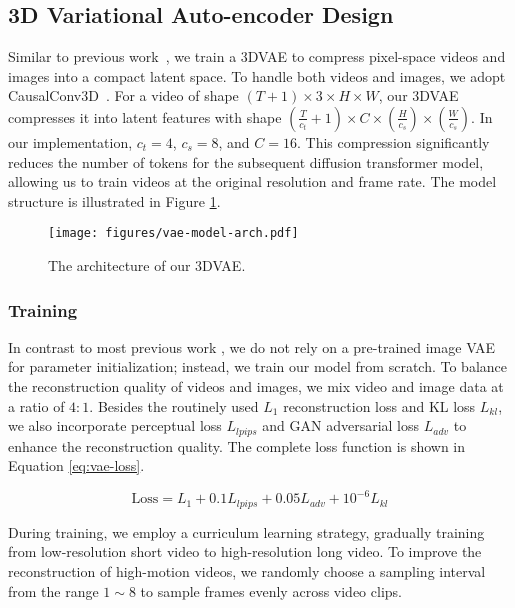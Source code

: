 \subsection{3D Variational Auto-encoder Design}\label{3dVAE}

Similar to previous work~\cite{polyak2024movie,yang2024cogvideox}, we train a 3DVAE to compress pixel-space videos and images into a compact latent space. To handle both videos and images, we adopt CausalConv3D~\cite{yu2023language}. For a video of shape $(T+1) \times 3 \times H \times W$, our 3DVAE compresses it into latent features with shape $(\frac{T}{c_t} + 1) \times C \times (\frac{H}{c_s}) \times (\frac{W}{c_s})$. In our implementation, $c_t=4$, $c_s=8$, and $C=16$. This compression significantly reduces the number of tokens for the subsequent diffusion transformer model, allowing us to train videos at the original resolution and frame rate. The model structure is illustrated in Figure \ref{fig:vae-model-arch}.

\begin{figure}[t]
    \centering
    \texttt{[image: figures/vae-model-arch.pdf]}
    \caption{ The architecture of our 3DVAE.}
    \label{fig:vae-model-arch}
\end{figure}

\subsubsection{Training}
In contrast to most previous work \cite{polyak2024movie,chen2024od,zhou2024allegro}, we do not rely on a pre-trained image VAE for parameter initialization; instead, we train our model from scratch. 
To balance the reconstruction quality of videos and images, we mix video and image data at a ratio of $4:1$. Besides the routinely used $L_1$ reconstruction loss and KL loss $L_{kl}$, we also incorporate perceptual loss $L_{lpips}$ and GAN adversarial loss $L_{adv}$ \cite{esser2021taming} to enhance the reconstruction quality. The complete loss function is shown in Equation \ref{eq:vae-loss}.

\begin{equation}
    \label{eq:vae-loss}
    \text{Loss} = L_{1} + 0.1 L_{lpips} + 0.05 L_{adv} + 10^{-6} L_{kl}
\end{equation}

During training, we employ a curriculum learning strategy, gradually training from low-resolution short video to high-resolution long video. To improve the reconstruction of high-motion videos, we randomly choose a sampling interval from the range $1 \sim 8$ to sample frames evenly across video clips.

